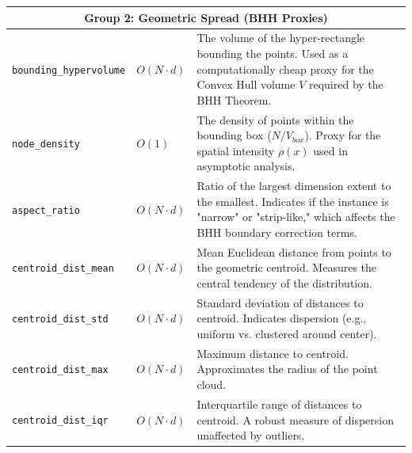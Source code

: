 \documentclass{article}
\begin{document}
\begin{longtable}{p{4cm} p{2.5cm} p{8.5cm}}
\multicolumn{3}{c}{\textbf{Group 2: Geometric Spread (BHH Proxies)}} \\
\midrule
\texttt{bounding\_hypervolume} & $O(N \cdot d)$ & The volume of the hyper-rectangle bounding the points. Used as a computationally cheap proxy for the Convex Hull volume $V$ required by the BHH Theorem. \\
\texttt{node\_density} & $O(1)$ & The density of points within the bounding box ($N / V_{box}$). Proxy for the spatial intensity $\rho(x)$ used in asymptotic analysis. \\
\texttt{aspect\_ratio} & $O(N \cdot d)$ & Ratio of the largest dimension extent to the smallest. Indicates if the instance is "narrow" or "strip-like," which affects the BHH boundary correction terms. \\
\texttt{centroid\_dist\_mean} & $O(N \cdot d)$ & Mean Euclidean distance from points to the geometric centroid. Measures the central tendency of the distribution. \\
\texttt{centroid\_dist\_std} & $O(N \cdot d)$ & Standard deviation of distances to centroid. Indicates dispersion (e.g., uniform vs. clustered around center). \\
\texttt{centroid\_dist\_max} & $O(N \cdot d)$ & Maximum distance to centroid. Approximates the radius of the point cloud. \\
\texttt{centroid\_dist\_iqr} & $O(N \cdot d)$ & Interquartile range of distances to centroid. A robust measure of dispersion unaffected by outliers. \\
\midrule


\end{longtable}
\end{document}
